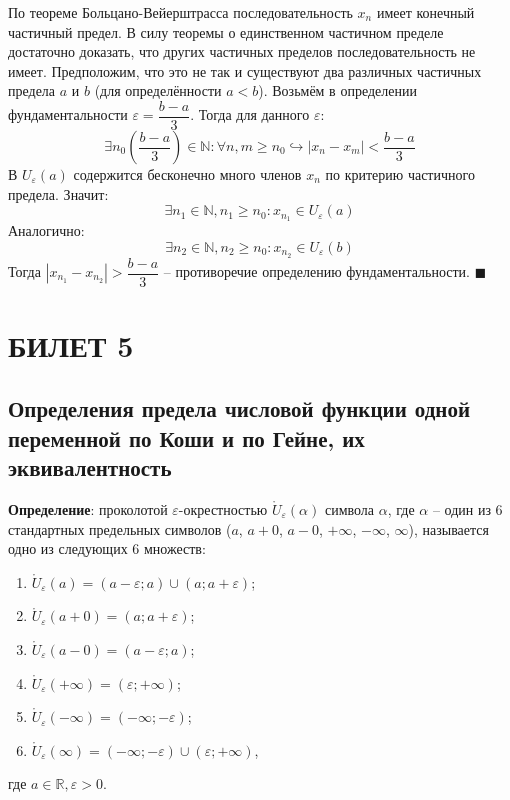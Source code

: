 \documentclass[12pt, a4paper, reqno]{article}
\begin{document}
    По теореме Больцано-Вейерштрасса последовательность $x_n$ имеет конечный частичный предел. В
    силу теоремы о единственном частичном пределе достаточно доказать, что других частичных пределов
    последовательность не имеет. Предположим, что это не так и существуют два различных частичных
    предела $a$ и $b$ (для определённости $a < b$). Возьмём в определении фундаментальности
    $\varepsilon = \dfrac{b - a}{3}$. Тогда для данного $\varepsilon$:
    \begin{equation*}
        \exists n_0\left(\dfrac{b - a}{3}\right)\in\mathbb{N}: \forall n, m \geq n_0
        \hookrightarrow|x_n - x_m| < \dfrac{b - a}{3}
    \end{equation*}
    В $U_{\varepsilon}(a)$ содержится бесконечно много членов $x_n$ по критерию частичного предела.
    Значит:
    \begin{equation*}
        \exists n_1\in\mathbb{N}, n_1 \geq n_0: x_{n_1}\in U_{\varepsilon}(a)
    \end{equation*}
    Аналогично:
    \begin{equation*}
        \exists n_2\in\mathbb{N}, n_2 \geq n_0: x_{n_2}\in U_{\varepsilon}(b)
    \end{equation*}
    Тогда $|x_{n_1} - x_{n_2}| > \dfrac{b - a}{3}$ -- противоречие определению фундаментальности.
    $\blacksquare$

\newpage
\section{БИЛЕТ 5}

\subsection{Определения предела числовой функции одной переменной по Коши и по Гейне, их эквивалентность}

    \textbf{Определение}: проколотой $\varepsilon$-окрестностью $\mathring U_{\varepsilon}(\alpha)$
    символа $\alpha$, где $\alpha$ -- один из 6 стандартных предельных символов ($a$, $a + 0$,
    $a - 0$, $+\infty$, $-\infty$, $\infty$), называется одно из следующих 6 множеств:
    \begin{enumerate}
        \item $\mathring U_{\varepsilon}(a) = (a - \varepsilon; a)\cup(a; a + \varepsilon)$;
        \item $\mathring U_{\varepsilon}(a + 0) = (a; a + \varepsilon)$;
        \item $\mathring U_{\varepsilon}(a - 0) = (a - \varepsilon; a)$;
        \item $\mathring U_{\varepsilon}(+\infty) = (\varepsilon; +\infty)$;
        \item $\mathring U_{\varepsilon}(-\infty) = (-\infty; -\varepsilon)$;
        \item $\mathring U_{\varepsilon}(\infty) = (-\infty; -\varepsilon)\cup(\varepsilon; +\infty)$,
    \end{enumerate}
    где $a\in\mathbb{R}, \varepsilon > 0$.
\end{document}
